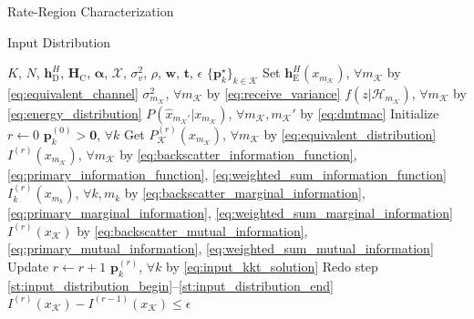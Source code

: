 \documentclass[journal]{IEEEtran}
\begin{document}
\begin{section}{Rate-Region Characterization}
\begin{subsection}{Input Distribution}
		\begin{algorithm}[!t]
			\caption{Numerical \gls{kkt} Input Distribution Evaluation by Limits of Sequence}
			\label{al:input_distribution}
			\begin{algorithmic}[1]
				\Require $K$, $N$, $\boldsymbol{h}_{\mathrm{D}}^H$, $\boldsymbol{H}_{\mathrm{C}}$, $\boldsymbol{\alpha}$, $\mathcal{X}$, $\sigma_v^2$, $\rho$, $\boldsymbol{w}$, $\boldsymbol{t}$, $\epsilon$
				\Ensure $\{\boldsymbol{p}_k^\star\}_{k \in \mathcal{K}}$
				\State Set $\boldsymbol{h}_{\mathrm{E}}^H(x_{m_{\mathcal{K}}})$, $\forall m_{\mathcal{K}}$ by \eqref{eq:equivalent_channel}
				\State \phantom{Set} $\sigma^2_{m_{\mathcal{K}}}$, $\forall m_{\mathcal{K}}$ by \eqref{eq:receive_variance}
				\State \phantom{Set} $f(z|\mathcal{H}_{m_{\mathcal{K}}})$, $\forall m_{\mathcal{K}}$ by \eqref{eq:energy_distribution}
				\State \phantom{Set} $P(\hat{x}_{m_{\mathcal{K}}'}|x_{m_{\mathcal{K}}})$, $\forall m_{\mathcal{K}}, m_{\mathcal{K}}'$ by \eqref{eq:dmtmac}
				\State Initialize $r \gets 0$
				\State \phantom{Initialize} $\boldsymbol{p}_k^{(0)} > \boldsymbol{0}$, $\forall k$
				\State Get $P_{\mathcal{K}}^{(r)}(x_{m_{\mathcal{K}}})$, $\forall m_{\mathcal{K}}$ by \eqref{eq:equivalent_distribution} \label{st:input_distribution_begin}
				\State \phantom{Get} $I^{(r)}(x_{m_{\mathcal{K}}})$, $\forall m_{\mathcal{K}}$ by \eqref{eq:backscatter_information_function}, \eqref{eq:primary_information_function}, \eqref{eq:weighted_sum_information_function}
				\State \phantom{Get} $I^{(r)}_k(x_{m_k})$, $\forall k,m_k$ by \eqref{eq:backscatter_marginal_information}, \eqref{eq:primary_marginal_information}, \eqref{eq:weighted_sum_marginal_information}
				\State \phantom{Get} $I^{(r)}(x_{\mathcal{K}})$ by \eqref{eq:backscatter_mutual_information}, \eqref{eq:primary_mutual_information}, \eqref{eq:weighted_sum_mutual_information} \label{st:input_distribution_end}
				\Repeat
					\State Update $r \gets r+1$
					\State \phantom{Update} $\boldsymbol{p}_k^{(r)}$, $\forall k$ by \eqref{eq:input_kkt_solution}
					\State Redo step \ref{st:input_distribution_begin}--\ref{st:input_distribution_end}
				\Until $I^{(r)}(x_{\mathcal{K}}) - I^{(r-1)}(x_{\mathcal{K}}) \le \epsilon$
			\end{algorithmic}
		\end{algorithm}
	\end{subsection}


\end{section}
\end{document}
